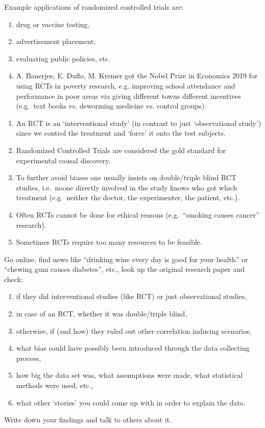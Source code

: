 \begin{Eg}
    Example applications of randomized controlled trials are:
    \begin{enumerate}
        \item drug or vaccine testing,
        \item advertisement placement,
        \item evaluating public policies, etc.
        \item A. Banerjee, E. Duflo, M. Kremer got the Nobel Prize in Economics 2019 for using RCTs in poverty research, e.g.\: improving school attendance and performance in poor areas via giving different towns different incentives (e.g.\ text books vs. deworming medicine vs. control groups).
    \end{enumerate}
\end{Eg}

\begin{Disc}
    \begin{enumerate}
        \item An RCT is an `interventional study' (in contrast to just `observational study') since we control the treatment and `force' it onto the test subjects.
        \item Randomized Controlled Trials are considered the gold standard for experimental causal discovery.
        \item To further avoid biases one usually insists on double/triple blind RCT studies, 
            i.e.\ noone directly involved in the study knows who got which treatment 
            (e.g.\ neither the doctor, the experimenter, the patient, etc.). 
        \item Often RCTs cannot be done for ethical reasons (e.g.\ ``smoking causes cancer'' research).
        \item Sometimes RCTs require too many resources to be feasible.
    \end{enumerate}
\end{Disc}


\begin{Exc}
    Go online, find news like ``drinking wine every day is good for your health'' or ``chewing gum causes diabetes'', etc., 
    look up the original research paper and check:
    \begin{enumerate}
        \item if they did interventional studies (like RCT) or just observational studies,
        \item in case of an RCT, whether it was double/triple blind,
        \item otherwise, if (and how) they ruled out other correlation inducing scenarios,
        \item what bias could have possibly been introduced through the data collecting process,
        \item how big the data set was, what assumptions were made, what statistical methods were used, etc.,
        \item what other `stories' you could come up with in order to explain the data.
    \end{enumerate}
    Write down your findings and talk to others about it.
\end{Exc}
